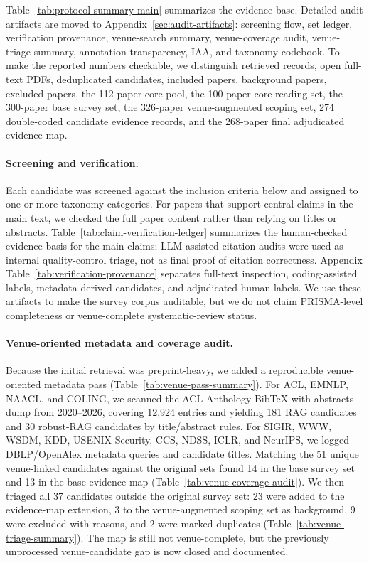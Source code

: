 \documentclass[11pt]{article}
\begin{document}
Table~\ref{tab:protocol-summary-main} summarizes the evidence base. Detailed audit artifacts are moved to Appendix~\ref{sec:audit-artifacts}: screening flow, set ledger, verification provenance, venue-search summary, venue-coverage audit, venue-triage summary, annotation transparency, IAA, and taxonomy codebook. To make the reported numbers checkable, we distinguish retrieved records, open full-text PDFs, deduplicated candidates, included papers, background papers, excluded papers, the 112-paper core pool, the 100-paper core reading set, the 300-paper base survey set, the 326-paper venue-augmented scoping set, 274 double-coded candidate evidence records, and the 268-paper final adjudicated evidence map.

\paragraph{Screening and verification.}
Each candidate was screened against the inclusion criteria below and assigned to one or more taxonomy categories. For papers that support central claims in the main text, we checked the full paper content rather than relying on titles or abstracts. Table~\ref{tab:claim-verification-ledger} summarizes the human-checked evidence basis for the main claims; LLM-assisted citation audits were used as internal quality-control triage, not as final proof of citation correctness. Appendix Table~\ref{tab:verification-provenance} separates full-text inspection, coding-assisted labels, metadata-derived candidates, and adjudicated human labels. We use these artifacts to make the survey corpus auditable, but we do not claim PRISMA-level completeness or venue-complete systematic-review status.

\paragraph{Venue-oriented metadata and coverage audit.}
Because the initial retrieval was preprint-heavy, we added a reproducible venue-oriented metadata pass (Table~\ref{tab:venue-pass-summary}). For ACL, EMNLP, NAACL, and COLING, we scanned the ACL Anthology BibTeX-with-abstracts dump from 2020--2026, covering 12,924 entries and yielding 181 RAG candidates and 30 robust-RAG candidates by title/abstract rules. For SIGIR, WWW, WSDM, KDD, USENIX Security, CCS, NDSS, ICLR, and NeurIPS, we logged DBLP/OpenAlex metadata queries and candidate titles. Matching the 51 unique venue-linked candidates against the original sets found 14 in the base survey set and 13 in the base evidence map (Table~\ref{tab:venue-coverage-audit}). We then triaged all 37 candidates outside the original survey set: 23 were added to the evidence-map extension, 3 to the venue-augmented scoping set as background, 9 were excluded with reasons, and 2 were marked duplicates (Table~\ref{tab:venue-triage-summary}). The map is still not venue-complete, but the previously unprocessed venue-candidate gap is now closed and documented.
\end{document}

